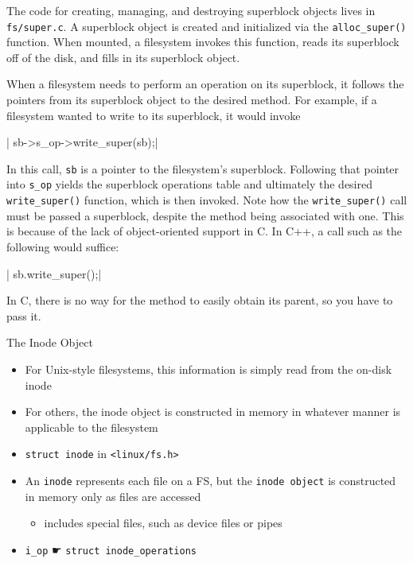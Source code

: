 The code for creating, managing, and destroying superblock objects lives in
\texttt{fs/super.c}. A superblock object is created and initialized via the
\verb|alloc_super()| function. When mounted, a filesystem invokes this function, reads its
superblock off of the disk, and fills in its superblock object.

When a filesystem needs to perform an operation on its superblock, it follows the pointers
from its superblock object to the desired method. For example, if a filesystem wanted to
write to its superblock, it would invoke

\begin{center}
  | sb->s_op->write_super(sb);|
\end{center}

In this call, \texttt{sb} is a pointer to the filesystem's superblock. Following that
pointer into \verb|s_op| yields the superblock operations table and ultimately the desired
\verb|write_super()| function, which is then invoked. Note how the \verb|write_super()|
call must be passed a superblock, despite the method being associated with one. This is
because of the lack of object-oriented support in C. In C++, a call such as the following
would suffice:

\begin{center}
  | sb.write_super();|
\end{center}

In C, there is no way for the method to easily obtain its parent, so you have to pass
it.

\begin{frame}
  \begin{block}{The Inode Object}
    \begin{itemize}
    \item For Unix-style filesystems, this information is simply read from the on-disk
      inode
    \item For others, the inode object is constructed in memory in whatever manner is
      applicable to the filesystem
    \item \texttt{struct inode} in \texttt{<linux/fs.h>}
    \item An \texttt{inode} represents each file on a FS, but the \texttt{inode object} is
      constructed in memory only as files are accessed
      \begin{itemize}
      \item includes special files, such as device files or pipes
      \end{itemize}
    \item \texttt{i\_op} {☛} \texttt{struct inode\_operations}
    \end{itemize}
  \end{block}  
\end{frame}

